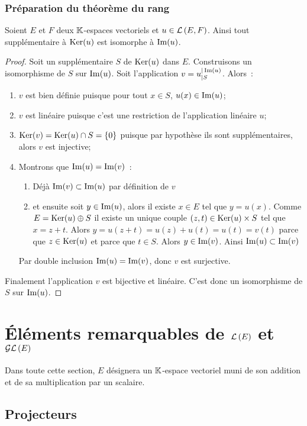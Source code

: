\subsubsection{Préparation du théorème du rang}

\begin{theo}\label{theo:preptheorang}
  Soient $E$ et $F$ deux $\mathbb{K}$-espaces vectoriels et $u \in \mathcal{L}\left(E,F\right)$. Ainsi tout supplémentaire à $\operatorname{Ker}(u)$ est isomorphe à $\operatorname{Im}(u)$.
\end{theo}
\begin{proof}
  Soit un supplémentaire $S$ de $\operatorname{Ker}(u)$ dans $E$. Construisons un isomorphisme de $S$ sur $\operatorname{Im}(u)$. Soit l'application $v=u_{|S}^{|\operatorname{Im}(u)}$. Alors~:
  \begin{enumerate}
  \item $v$ est bien définie puisque pour tout $x \in S$, $u(x) \in \operatorname{Im}(u)$;
  \item $v$ est linéaire puisque c'est une restriction de l'application linéaire $u$;
  \item $\operatorname{Ker}(v)=\operatorname{Ker}(u) \cap S =\{0\}$ puisque par hypothèse ils sont supplémentaires, alors $v$ est injective;
  \item Montrons que $\operatorname{Im}(u)=\operatorname{Im}(v)$~:
    \begin{enumerate}
    \item Déjà $\operatorname{Im}(v) \subset \operatorname{Im}(u)$ par définition de $v$
    \item et ensuite soit $y \in \operatorname{Im}(u)$, alors il existe $x \in E$ tel que $y=u(x)$. Comme $E=\operatorname{Ker}(u) \oplus S$ il existe un unique couple $(z,t) \in \operatorname{Ker}(u) \times S$ tel que $x=z+t$. Alors $y=u(z+t)=u(z)+u(t)=u(t)=v(t)$ parce que $z \in \operatorname{Ker}(u)$ et parce que $t \in S$. Alors $y \in \operatorname{Im}(v)$. Ainsi $\operatorname{Im}(u) \subset \operatorname{Im}(v)$
    \end{enumerate}
    Par double inclusion $\operatorname{Im}(u)=\operatorname{Im}(v)$, donc $v$ est surjective.
  \end{enumerate}
  Finalement l'application $v$ est bijective et linéaire. C'est donc un isomorphisme de $S$ sur $\operatorname{Im}(u)$.
\end{proof}

\section{Éléments remarquables de $\mathcal{L}\left(E\right)$ et $\mathcal{GL}\left(E\right)$}
Dans toute cette section, $E$ désignera un $\mathbb{K}$-espace vectoriel muni de son addition et de sa multiplication par un scalaire.
\subsection{Projecteurs}

